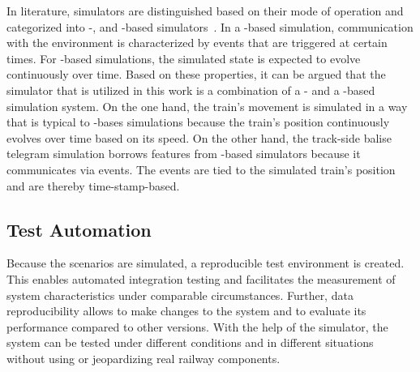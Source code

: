 In literature, simulators are distinguished based on their mode of operation and categorized into -, and -based simulators~\cite{CoSimulationStateOfTheArt}.
In a -based simulation, communication with the environment is characterized by events that are triggered at certain times.
For -based simulations, the simulated state is expected to evolve continuously over time.
Based on these properties, it can be argued that the simulator that is utilized in this work is a combination of a - and a -based simulation system.
On the one hand, the train's movement is simulated in a way that is typical to -bases simulations because the train's position continuously evolves over time based on its speed.
On the other hand, the track-side balise telegram simulation borrows features from -based simulators because it communicates via events.
The events are tied to the simulated train's position and are thereby time-stamp-based.


\subsection{Test Automation}
\label{subsec:testautomation}

Because the scenarios are simulated, a reproducible test environment is created.
This enables automated integration testing and facilitates the measurement of system characteristics under comparable circumstances.
Further, data reproducibility allows to make changes to the system and to evaluate its performance compared to other versions.
With the help of the simulator, the system can be tested under different conditions and in different situations without using or jeopardizing real railway components.
\\

